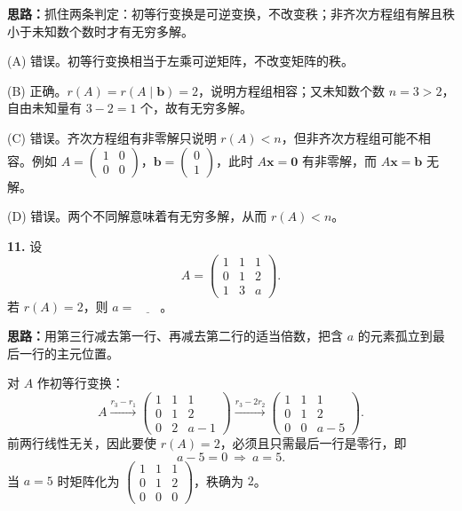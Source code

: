 \ifshowsolutions%
\textbf{思路：}抓住两条判定：初等行变换是可逆变换，不改变秩；非齐次方程组有解且秩小于未知数个数时才有无穷多解。

(A) 错误。初等行变换相当于左乘可逆矩阵，不改变矩阵的秩。

(B) 正确。\(r(A)=r(A\mid\boldsymbol b)=2\)，说明方程组相容；又未知数个数 \(n=3>2\)，自由未知量有 \(3-2=1\) 个，故有无穷多解。

(C) 错误。齐次方程组有非零解只说明 \(r(A)<n\)，但非齐次方程组可能不相容。例如
\(A=\begin{pmatrix}1&0\\0&0\end{pmatrix}\)，\(\boldsymbol b=\begin{pmatrix}0\\1\end{pmatrix}\)，此时 \(A\boldsymbol x=\boldsymbol 0\) 有非零解，而 \(A\boldsymbol x=\boldsymbol b\) 无解。

(D) 错误。两个不同解意味着有无穷多解，从而 \(r(A)<n\)。

\else \answerarea[8] \fi%

\textbf{11.} 设
\[
A=\begin{pmatrix}1&1&1\\0&1&2\\1&3&a\end{pmatrix}.
\]
若 \(r(A)=2\)，则 \(a=\underline{\qquad}\)。

\ifshowsolutions%
\textbf{思路：}用第三行减去第一行、再减去第二行的适当倍数，把含 \(a\) 的元素孤立到最后一行的主元位置。

对 \(A\) 作初等行变换：
\[
A\xrightarrow{r_3-r_1}
\begin{pmatrix}1&1&1\\0&1&2\\0&2&a-1\end{pmatrix}
\xrightarrow{r_3-2r_2}
\begin{pmatrix}1&1&1\\0&1&2\\0&0&a-5\end{pmatrix}.
\]
前两行线性无关，因此要使 \(r(A)=2\)，必须且只需最后一行是零行，即
\[
a-5=0\ \Longrightarrow\ a=5.
\]
当 \(a=5\) 时矩阵化为 \(\begin{pmatrix}1&1&1\\0&1&2\\0&0&0\end{pmatrix}\)，秩确为 \(2\)。

\else \answerarea[6] \fi%

